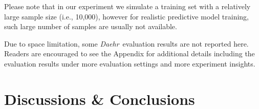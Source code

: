 \documentclass[journal,compsoc]{IEEEtran}
\newcommand{\TheName}{\mbox{\emph{Daehr}}}
\begin{document}
Please note that in our experiment we simulate a training set with a relatively large sample size (i.e., 10,000), however for realistic predictive model training, such large number of samples are usually not available.


Due to space limitation, some \TheName\ evaluation results are not reported here. Readers are encouraged to see the Appendix for additional details including the evaluation results under more evaluation settings and more experiment insights.

\section{Discussions \& Conclusions}~\label{sec:6}

%


\end{document}
